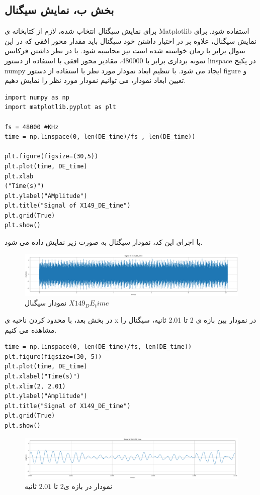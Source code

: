 \subsection{بخش ب، نمایش سیگنال}
برای نمایش سیگنال انتخاب شده، لازم از کتابخانه ی Matplotlib استفاده شود. برای نمایش سیگنال، علاوه بر در اختیار داشتن خود سیگنال باید مقدار محور افقی که در این سوال برابر با زمان خواسته شده است نیز محاسبه شود. با در نظر داشتن فرکانس نمونه برداری برابر با 480000، مقادیر محور افقی با استفاده از دستور linspace در پکیج numpy ایجاد می شود. با تنظیم ابعاد نمودار مورد نظر با استفاده از دستور figure و تعیین ابعاد نمودار، می توانیم نمودار مورد نظر را نمایش دهیم.
\begin{verbatim}
import numpy as np
import matplotlib.pyplot as plt

fs = 48000 #KHz
time = np.linspace(0, len(DE_time)/fs , len(DE_time))

plt.figure(figsize=(30,5))
plt.plot(time, DE_time)
plt.xlab
("Time(s)")
plt.ylabel("AMplitude")
plt.title("Signal of X149_DE_time")
plt.grid(True)
plt.show()
\end{verbatim}
با اجرای این کد، نمودار سیگنال به صورت زیر نمایش داده می شود.
\begin{figure}[H]
	\centering
	\includegraphics[width=1\linewidth]{../img/1}
	\caption{نمودار سیگنال $X149_DE_time$}
	\label{fig:1_}
\end{figure}

در بخش بعد، با محدود کردن ناحیه ی x در نمودار بین بازه ی 2 تا 2.01 ثانیه، سیگنال را مشاهده می کنیم.
\begin{verbatim}
time = np.linspace(0, len(DE_time)/fs, len(DE_time))
plt.figure(figsize=(30, 5))
plt.plot(time, DE_time)
plt.xlabel("Time(s)")
plt.xlim(2, 2.01)
plt.ylabel("Amplitude") 
plt.title("Signal of X149_DE_time")
plt.grid(True)
plt.show()
\end{verbatim}
\begin{figure}[H]
	\centering
	\includegraphics[width=1\linewidth]{../img/2}
	\caption{نمودار در بازه  ی2 تا $2.01$ ثانیه}
	\label{fig:2_}
\end{figure}


